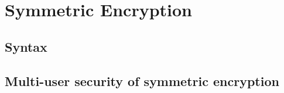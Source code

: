 \documentclass[../../main.tex]{subfiles}
\begin{document}
\onlyinsubfile
{
    
}

\section{Symmetric Encryption}\label{sec-se}
    \subsection{Syntax}
    \subsection{Multi-user security of symmetric encryption}\label{sec-se-mu-defs}



\onlyinsubfile
{
    \begin{small}
        
        
    \end{small}
}
\end{document}
